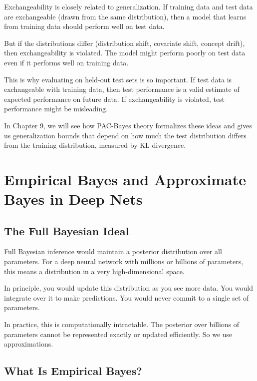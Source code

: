 Exchangeability is closely related to generalization. If training data and test data are exchangeable (drawn from the same distribution), then a model that learns from training data should perform well on test data.

But if the distributions differ (distribution shift, covariate shift, concept drift), then exchangeability is violated. The model might perform poorly on test data even if it performs well on training data.

This is why evaluating on held-out test sets is so important. If test data is exchangeable with training data, then test performance is a valid estimate of expected performance on future data. If exchangeability is violated, test performance might be misleading.

In Chapter 9, we will see how PAC-Bayes theory formalizes these ideas and gives us generalization bounds that depend on how much the test distribution differs from the training distribution, measured by KL divergence.

\vspace{2em}

\section{Empirical Bayes and Approximate Bayes in Deep Nets}

\subsection{The Full Bayesian Ideal}

Full Bayesian inference would maintain a posterior distribution over all parameters. For a deep neural network with millions or billions of parameters, this means a distribution in a very high-dimensional space.

In principle, you would update this distribution as you see more data. You would integrate over it to make predictions. You would never commit to a single set of parameters.

In practice, this is computationally intractable. The posterior over billions of parameters cannot be represented exactly or updated efficiently. So we use approximations.

\subsection{What Is Empirical Bayes?}

